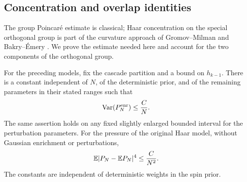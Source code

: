 \subsection{Concentration and overlap identities}

The group Poincar\'e estimate is classical; Haar concentration on the
special orthogonal group is part of the curvature approach of
Gromov--Milman and Bakry--\'Emery \cite{GromovMilman1983,BakryEmery1985}.
We prove the estimate needed here and account for the two components
of the orthogonal group.

\begin{lemma}[Concentration]\label{rot:concentration}
For the preceding models, fix the cascade partition and a bound on
\(h_{k-1}\).  There is a constant independent of \(N\), of the
deterministic prior, and of the remaining parameters in their stated
ranges such that
\begin{equation}\label{rot:variance}
 \operatorname{Var}(P_N^{\mathrm{enr}})\le \frac CN.
\end{equation}
The same assertion holds on any fixed slightly enlarged bounded
interval for the perturbation parameters.  For the pressure of the
original Haar model, without Gaussian enrichment or perturbations,
\begin{equation}\label{rot:fourth}
 \mathbb E|P_N-\mathbb E P_N|^4\le \frac C{N^2}.
\end{equation}
The constants are independent of deterministic weights in the spin
prior.
\end{lemma}

